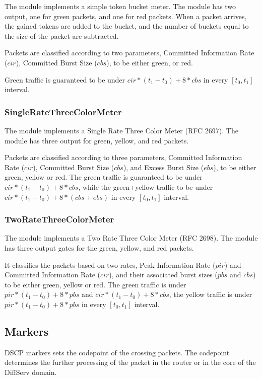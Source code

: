 The  module implements a simple token bucket meter.
The module has two output, one for green packets, and one for red packets.
When a packet arrives, the gained tokens are added to the bucket, and
the number of buckets equal to the size of the packet are subtracted.

Packets are classified according to two parameters,
Committed Information Rate ($cir$), Committed Burst Size ($cbs$),
to be either green, or red.

Green traffic is guaranteed to be under $cir*(t_1-t_0)+8*cbs$ in
every $[t_0,t_1]$ interval.

\subsubsection*{SingleRateThreeColorMeter}

The  module implements a
Single Rate Three Color Meter (RFC 2697).
The module has three output for green, yellow, and red packets.

Packets are classified according to three parameters,
Committed Information Rate ($cir$), Committed Burst Size ($cbs$),
and Excess Burst Size ($ebs$), to be either green, yellow or red.
The green traffic is guaranteed to be under $cir*(t_1-t_0)+8*cbs$,
while the green+yellow traffic to be under $cir*(t_1-t_0)+8*(cbs+ebs)$
in every $[t_0,t_1]$ interval.


\subsubsection*{TwoRateThreeColorMeter}

The  module implements a
Two Rate Three Color Meter (RFC 2698). The module has three output
gates for the green, yellow, and red packets.

It classifies the packets based on two rates, Peak Information Rate ($pir$)
and Committed Information Rate ($cir$), and their associated burst sizes
($pbs$ and $cbs$) to be either green, yellow or red. The green traffic
is under $pir*(t_1-t_0)+8*pbs$ and $cir*(t_1-t_0)+8*cbs$, the yellow traffic
is under $pir*(t_1-t_0)+8*pbs$ in every $[t_0,t_1]$ interval.

\subsection{Markers}

DSCP markers sets the codepoint of the crossing packets.
The codepoint determines the further processing of the packet
in the router or in the core of the DiffServ domain.

